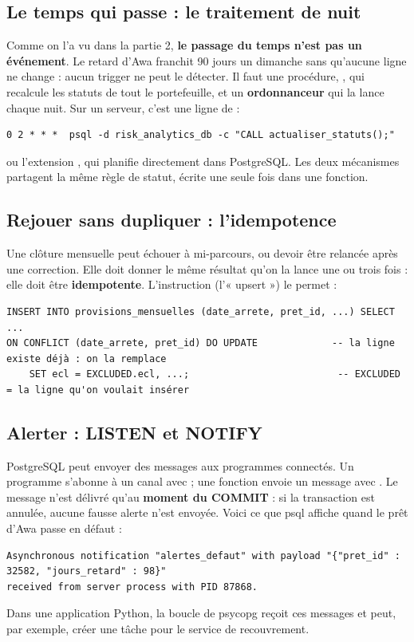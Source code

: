 \subsection{Le temps qui passe : le traitement de nuit}

Comme on l'a vu dans la partie 2, \textbf{le passage du temps n'est pas un événement}. Le retard d'Awa
franchit 90 jours un dimanche sans qu'aucune ligne ne change : aucun trigger ne peut le détecter. Il faut
une procédure, , qui recalcule les statuts de tout le portefeuille, et un
\textbf{ordonnanceur} qui la lance chaque nuit. Sur un serveur, c'est une ligne de  :
\begin{lstlisting}[style=shell]
0 2 * * *  psql -d risk_analytics_db -c "CALL actualiser_statuts();"
\end{lstlisting}
ou l'extension , qui planifie directement dans PostgreSQL. Les deux mécanismes partagent
la même règle de statut, écrite une seule fois dans une fonction.

\subsection{Rejouer sans dupliquer : l'idempotence}

Une clôture mensuelle peut échouer à mi-parcours, ou devoir être relancée après une correction. Elle
doit donner le même résultat qu'on la lance une ou trois fois : elle doit être \textbf{idempotente}.
L'instruction  (l'« upsert ») le permet :
\begin{lstlisting}[style=sql]
INSERT INTO provisions_mensuelles (date_arrete, pret_id, ...) SELECT ...
ON CONFLICT (date_arrete, pret_id) DO UPDATE             -- la ligne existe déjà : on la remplace
    SET ecl = EXCLUDED.ecl, ...;                          -- EXCLUDED = la ligne qu'on voulait insérer
\end{lstlisting}

\subsection{Alerter : LISTEN et NOTIFY}

PostgreSQL peut envoyer des messages aux programmes connectés. Un programme s'abonne à un canal avec
 ; une fonction envoie un message avec . Le message n'est délivré qu'au \textbf{moment du COMMIT} : si la transaction est annulée,
aucune fausse alerte n'est envoyée. Voici ce que psql affiche quand le prêt d'Awa passe en défaut :
\begin{lstlisting}[style=sortie]
Asynchronous notification "alertes_defaut" with payload "{"pret_id" : 32582, "jours_retard" : 98}"
received from server process with PID 87868.
\end{lstlisting}
Dans une application Python, la boucle  de psycopg reçoit ces
messages et peut, par exemple, créer une tâche pour le service de recouvrement.

